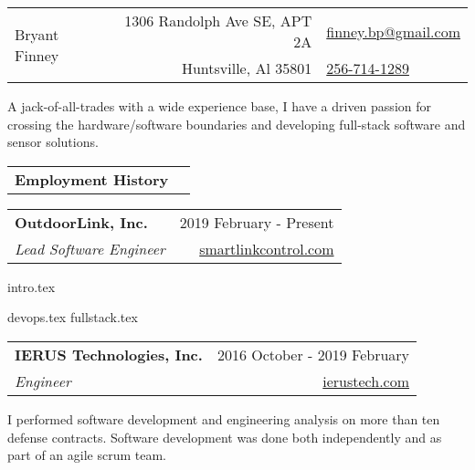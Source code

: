 \documentclass[10pt,a4paper]{article}
\newcommand{\csection}[1]{\Large\textbf{#1}}
\newcommand{\csubsection}[1]{\large\textbf{#1}}
\begin{document}
\begin{table}
  \noindent\begin{tabularx}{\textwidth}{Xr|l}
    \toprule
    \multirow{2}{*}{\Huge Bryant Finney} & 1306 Randolph Ave SE, APT 2A & \href{mailto:finneybp@gmail.com}{finney.bp@gmail.com} \\
                                         & Huntsville, Al 35801         & \href{tel:1-256-714-1289}{256-714-1289}               \\
    \bottomrule
  \end{tabularx}
\end{table}

A jack-of-all-trades with a wide experience base, I have a driven passion for crossing
the hardware/software boundaries and developing full-stack software and sensor solutions.

\bigskip

\noindent\begin{tabularx}{\textwidth}{Xr}
  \csection{Employment History} & \\
\end{tabularx}
\smallskip

\noindent\begin{tabularx}{\textwidth}{Xr}
  \toprule
  \csubsection{OutdoorLink, Inc.} & 2019 February - Present                                   \\
  \textit{Lead Software Engineer} & \href{http://smartlinkcontrol.com/}{smartlinkcontrol.com} \\
\end{tabularx}
\smallskip

{intro.tex}

\bigskip

{devops.tex}
{fullstack.tex}

\bigskip

\noindent\begin{tabularx}{\textwidth}{Xr}
  \toprule
  \csubsection{IERUS Technologies, Inc.} & 2016 October - 2019 February                     \\
  \textit{Engineer}                      & \href{https://www.ierustech.com/}{ierustech.com} \\
\end{tabularx}
\smallskip

I performed software development and engineering analysis on more than ten defense
contracts. Software development was done both independently and as part of an agile
scrum team.
\end{document}
